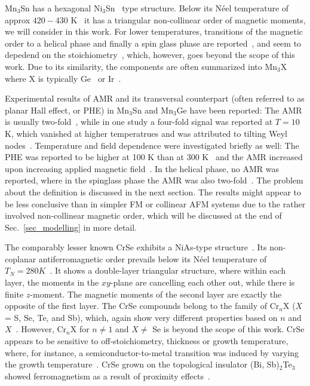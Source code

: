 \documentclass[prb,showpacs,amsmath,amssymb,superscriptaddress,twocolumn,floatfix]{revtex4-1}
\begin{document}
Mn$_3$Sn has a hexagonal Ni$_3$Sn~\cite{Nakatsuji:2015} type structure. Below its N\'eel temperature of approx $420-430$ K~\cite{Sharma:2023, Cable:1993, Nakatsuji:2015, Zhou:2020, Chen:2021, Ikhlas:2017} it has a triangular non-collinear order of magnetic moments, we will consider in this work. For lower temperatures, transitions of the magnetic order to a helical phase and finally a spin glass phase are reported~\cite{Park:2018, Sharma:2023,Chen:2021}, and seem to depedend on the stoichiometry~\cite{Park:2018}, which, however, goes beyond the scope of this work. Due to its similarity, the components are often summarized into Mn$_3$X~\cite{Chen:2021} where X is typically Ge~\cite{Sharma:2023, Manna:2018, Wu:2023, Chen:2021, Cable:1993} or Ir~\cite{Gonzalez-Hernandez:2024,Zelezny:2017}.

Experimental results of AMR and its transversal counterpart (often referred to as planar Hall effect, or PHE) in Mn$_3$Sn and Mn$_3$Ge have been reported: The AMR is usually two-fold~\cite{Sharma:2023, Chen:2021,Wu:2023}, while in one study a four-fold signal was reported at $ T = 10$ K, which vanished at higher temperatrues and was attributed to tilting Weyl nodes~\cite{Wu:2023}. Temperature and field dependence were investigated briefly as well: The PHE was reported to be higher at 100 K than at 300 K~\cite{Chen:2021} and the AMR increased upon increasing applied magnetic field~\cite{Sharma:2023}. In the helical phase, no AMR was reported, where in the spinglass phase the AMR was also two-fold~\cite{Sharma:2023}. The problem about the definition is discussed in the next section. The results might appear to be less conclusive than in simpler FM or collinear AFM systems due to the rather involved non-collinear magnetic order, which will be discussed at the end of Sec.~\ref{sec_modelling} in more detail.



The comparably lesser known CrSe exhibits a NiAs-type structure~\cite{Corliss:1961}. Its non-coplanar antiferromagnetic order prevails below its N\'eel temperature of $T_N = 280K$~\cite{Tajima:2024, Polesya:2010}. It shows a double-layer triangular structure, where within each layer, the moments in the $xy$-plane are cancelling each other out, while there is finite $z$-moment. The magnetic moments of the second layer are exactly the opposite of the first layer. The CrSe compounds belong to the family of Cr$_n$X ($X$ = S, Se, Te, and Sb), which, again show very different properties based on $n$ and $X$~\cite{Tajima:2024, Polesya:2010}. However, Cr$_n$X for $n \neq 1$ and $X \neq$ Se is beyond the scope of this work. CrSe appears to be sensitive to off-stoichiometry, thickness or growth temperature, where, for instance, a semiconductor-to-metal transition was induced by varying the growth temperature~\cite{Tajima:2024}. CrSe grown on the topological insulator (Bi, Sb)$_2$Te$_3$ showed ferromagnetism as a result of proximity effects~\cite{Yang:2020}. \\
\end{document}
